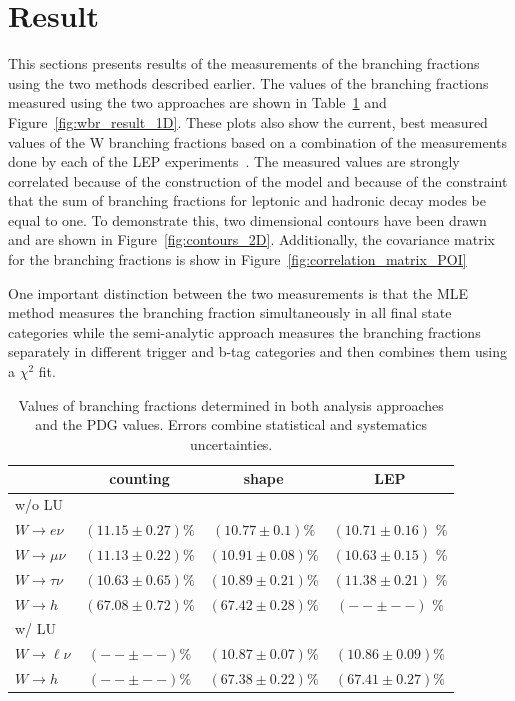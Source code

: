 \section{Result}
\label{sec:analysis:result}


This sections presents results of the measurements of the branching
fractions using the two methods described earlier.  The values of the
branching fractions measured using the two approaches are shown in
Table~\ref{tab:results} and Figure~\ref{fig:wbr_result_1D}.  These plots
also show the current, best measured values of the W branching fractions
based on a combination of the measurements done by each of the LEP
experiments~\cite{Schael:2013ita}.  The measured values are strongly
correlated because of the construction of the model and because of the
constraint that the sum of branching fractions for leptonic and hadronic
decay modes be equal to one.  To demonstrate this, two dimensional
contours have been drawn and are shown in Figure~\ref{fig:contours_2D}.
Additionally, the covariance matrix for the branching fractions is show
in Figure~\ref{fig:correlation_matrix_POI}

One important distinction between the two measurements is that the MLE
method measures the branching fraction simultaneously in all final state
categories while the semi-analytic approach measures the branching fractions
separately in different trigger and b-tag categories and then combines
them using a $\chi^{2}$ fit.  

\begin{table}[htb!]
    \centering
    \setlength{\tabcolsep}{1.5em}
    \renewcommand{\arraystretch}{1.}
    \caption{Values of branching fractions determined in both
        analysis approaches and the PDG values.  Errors combine
        statistical and systematics uncertainties.
    \label{tab:results}}
    \begin{tabular}{l|ccc}
                           & counting              & shape                 & LEP \\
    \hline                                                                 
    w/o LU &&& \\
    \hline
    $W\rightarrow e\nu$    & $(11.15 \pm 0.27) \%$ & $(10.77 \pm 0.1) \%$  & $(10.71 \pm 0.16)$ \% \\
    $W\rightarrow \mu\nu$  & $(11.13 \pm 0.22) \%$ & $(10.91 \pm 0.08) \%$ & $(10.63 \pm 0.15)$ \% \\
    $W\rightarrow \tau\nu$ & $(10.63 \pm 0.65) \%$ & $(10.89 \pm 0.21) \%$ & $(11.38 \pm 0.21)$ \% \\
    $W\rightarrow h$       & $(67.08 \pm 0.72) \%$ & $(67.42 \pm 0.28) \%$ & $(-- \pm --)$ \% \\
    \hline
    w/ LU &&& \\
    \hline
    $W\rightarrow \ell\nu$ & $(-- \pm --)\%$       & $(10.87 \pm 0.07)\%$  & $(10.86 \pm 0.09)\%$  \\
    $W\rightarrow h$       & $(-- \pm --)\%$       & $(67.38 \pm 0.22)\%$  & $(67.41 \pm 0.27)\%$  \\
    \end{tabular}
\end{table}


